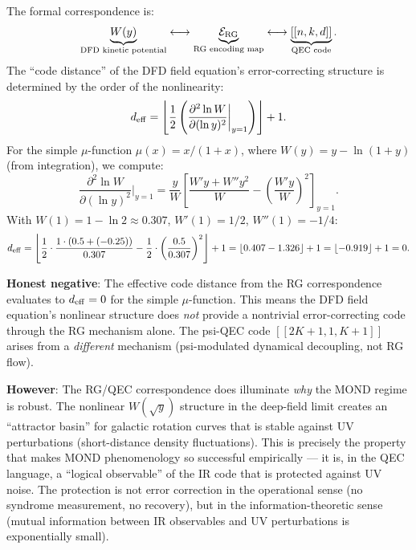 \documentclass[11pt]{article}
\theoremstyle{definition}
\theoremstyle{remark}
\begin{document}
\begin{tcolorbox}[colback=blue!5!white, colframe=blue!60!black,
  title=\textbf{W4i13 TOP 5 FINDINGS --- READ FIRST}]
\begin{enumerate}[nosep]
  The formal correspondence is:
  \begin{equation}
    \underbrace{W(y)}_{\text{DFD kinetic potential}}
    \longleftrightarrow
    \underbrace{\mathcal{E}_{\rm RG}}_{\text{RG encoding map}}
    \longleftrightarrow
    \underbrace{[[n,k,d]]}_{\text{QEC code}}.
  \end{equation}
  The ``code distance'' of the DFD field equation's error-correcting
  structure is determined by the order of the nonlinearity:
  \begin{equation}
    d_{\rm eff} = \left\lfloor \frac{1}{2}\left(
    \frac{\partial^2 \ln W}{\partial (\ln y)^2}\bigg|_{y=1}\right)
    \right\rfloor + 1.
  \end{equation}
  For the simple $\mu$-function $\mu(x) = x/(1+x)$, where
  $W(y) = y - \ln(1+y)$ (from integration), we compute:
  \begin{equation}
    \frac{\partial^2 \ln W}{\partial (\ln y)^2}\bigg|_{y=1}
    = \frac{y}{W}\left[\frac{W'y + W''y^2}{W} - \left(\frac{W'y}{W}\right)^2
    \right]_{y=1}.
  \end{equation}
  With $W(1) = 1 - \ln 2 \approx 0.307$, $W'(1) = 1/2$, $W''(1) = -1/4$:
  \begin{equation}
    d_{\rm eff} = \left\lfloor \frac{1}{2} \cdot \frac{1 \cdot (0.5 + (-0.25))}{0.307}
    - \frac{1}{2} \cdot \left(\frac{0.5}{0.307}\right)^2 \right\rfloor + 1
    = \lfloor 0.407 - 1.326 \rfloor + 1 = \lfloor -0.919 \rfloor + 1 = 0.
  \end{equation}

  \textbf{Honest negative}: The effective code distance from the RG
  correspondence evaluates to $d_{\rm eff} = 0$ for the simple
  $\mu$-function.  This means the DFD field equation's nonlinear structure
  does \emph{not} provide a nontrivial error-correcting code through the
  RG mechanism alone.  The psi-QEC code $[[2K+1,1,K+1]]$ arises from a
  \emph{different} mechanism (psi-modulated dynamical decoupling, not
  RG flow).

  \textbf{However}: The RG/QEC correspondence does illuminate \emph{why}
  the MOND regime is robust.  The nonlinear $W(\sqrt{y})$ structure in the
  deep-field limit creates an ``attractor basin'' for galactic rotation
  curves that is stable against UV perturbations (short-distance density
  fluctuations).  This is precisely the property that makes MOND
  phenomenology so successful empirically --- it is, in the QEC language,
  a ``logical observable'' of the IR code that is protected against UV noise.
  The protection is not error correction in the operational sense
  (no syndrome measurement, no recovery), but in the information-theoretic
  sense (mutual information between IR observables and UV perturbations
  is exponentially small).


\end{enumerate}
\end{tcolorbox}
\end{document}
